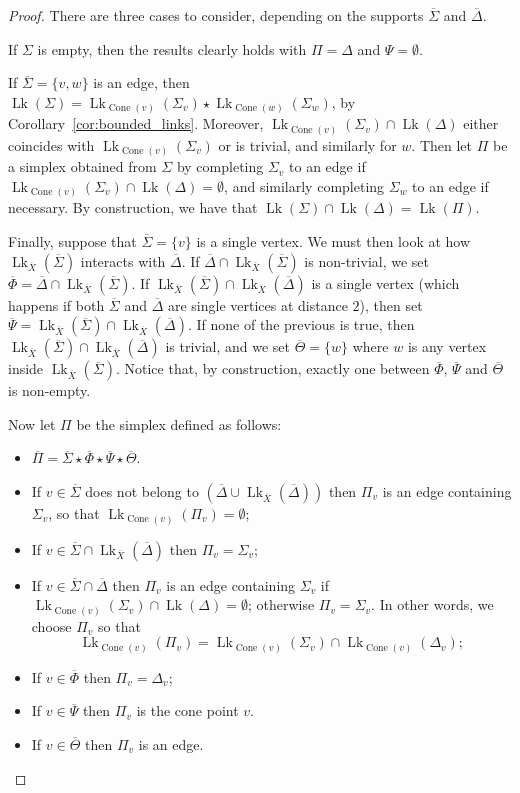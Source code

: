 \documentclass[svgnames]{amsart}
\theoremstyle{plain}
\theoremstyle{definition}
\newcommand{\ov}[1]{\overline{#1}}
\newcommand{\link}{\operatorname{Lk}}
\newcommand{\Squid}{\operatorname{Cone}}
\begin{document}
\begin{proof}
There are three cases to consider, depending on the supports $\ov\Sigma$ and $\ov \Delta$.

If $\Sigma$ is empty, then the results clearly holds with $\Pi=\Delta$ and $\Psi=\emptyset$.
\par\medskip
If $\ov\Sigma=\{v,w\}$ is an edge, then $\link(\Sigma)=\link_{\Squid(v)}(\Sigma_v)\star \link_{\Squid(w)}(\Sigma_w) $, by Corollary~\ref{cor:bounded_links}. Moreover, $\link_{\Squid(v)}(\Sigma_v)\cap \link(\Delta)$ either coincides with $\link_{\Squid(v)}(\Sigma_v)$ or is trivial, and similarly for $w$. Then let $\Pi$ be a simplex obtained from $\Sigma$ by completing $\Sigma_v$ to an edge if $\link_{\Squid(v)}(\Sigma_v)\cap \link(\Delta)=\emptyset$, and similarly completing $\Sigma_w$ to an edge if necessary. By construction, we have that
$\link(\Sigma)\cap\link(\Delta)=\link(\Pi)$. 

\par\medskip
Finally, suppose that $\ov\Sigma=\{v\}$ is a single vertex. We must then look at how $\link_{\ov X}(\ov\Sigma)$ interacts with $\ov\Delta$. If $\ov\Delta\cap\link_{\ov X}(\ov \Sigma)$ is non-trivial, we set $\ov\Phi=\ov\Delta\cap\link_{\ov X}(\ov \Sigma)$. If $\link_{\ov X}(\ov \Sigma)\cap \link_{\ov X}(\ov \Delta)$ is a single vertex (which happens if both $\ov\Sigma$ and $\ov\Delta$ are single vertices at distance $2$), then set $\ov\Psi=\link_{\ov X}(\ov \Sigma)\cap \link_{\ov X}(\ov \Delta)$. If none of the previous is true, then $\link_{\ov X}(\ov \Sigma)\cap \link_{\ov X}(\ov \Delta)$ is trivial, and we set $\ov \Theta=\{w\}$ where $w$ is any vertex inside $\link_{\ov X}(\ov\Sigma)$. Notice that, by construction, exactly one between $\ov\Phi$, $\ov\Psi$ and $\ov\Theta$ is non-empty.

Now let $\Pi$ be the simplex defined as follows:
\begin{itemize}
    \item $\ov\Pi=\ov\Sigma\star\ov\Phi\star\ov\Psi\star\ov\Theta$.
    \item If $v\in \ov\Sigma$ does not belong to $( \ov\Delta\cup\link_{\ov X}(\ov\Delta))$ then $\Pi_v$ is an edge containing $\Sigma_v$, so that $\link_{\Squid(v)}\left(\Pi_v\right)=\emptyset$;
    \item If $v\in \ov\Sigma\cap \link_{\ov X}(\ov\Delta)$ then $\Pi_v= \Sigma_v$;
    \item If $v\in \ov\Sigma\cap \ov\Delta$ then $\Pi_v$ is an edge containing $\Sigma_v$ if $\link_{\Squid(v)}(\Sigma_v)\cap \link(\Delta)=\emptyset$; otherwise $\Pi_v=\Sigma_v$. In other words, we choose $\Pi_v$ so that 
    $$\link_{\Squid(v)}\left(\Pi_v\right)=\link_{\Squid(v)}(\Sigma_v)\cap \link_{\Squid(v)}(\Delta_v);$$
    \item If $v\in \ov\Phi$ then $\Pi_v= \Delta_v$;
    \item If $v\in \ov\Psi$ then $\Pi_v$ is the cone point $v$.
    \item If $v\in \ov\Theta$ then $\Pi_v$ is an edge.
\end{itemize}


\end{proof}
\end{document}
